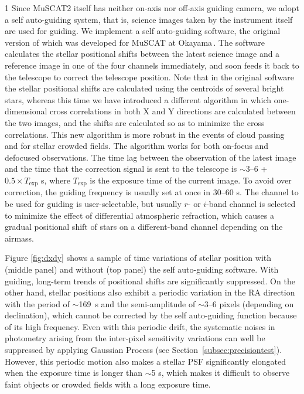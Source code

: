 \documentclass[a4paper,12pt]{spieman}  %
\begin{document}
\begin{spacing}{1}
Since MuSCAT2 itself has neither on-axis nor off-axis guiding camera,
we adopt a self auto-guiding system, that is, science images taken by the instrument itself
are used for guiding.
We implement a self auto-guiding software, the original version of which was developed
for MuSCAT at Okayama\cite{2015JATIS...1d5001N}\,\!.
The software calculates the stellar positional shifts between the latest science image and
a reference image in one of the four channels immediately,
and soon feeds it back to the telescope to correct the telescope position. 
Note that in the original software the stellar positional shifts are calculated
using the centroids of several bright stars, whereas this time we have introduced
a different algorithm in which one-dimensional cross correlations in both X and Y directions
are calculated between the two images,
and the shifts are calculated so as to minimize the cross correlations.
This new algorithm is more robust in the events of cloud passing and for stellar crowded fields.
The algorithm works for both on-focus and defocused observations.
The time lag between the observation of the latest image and the time that
the correction signal is sent to the telescope is $\sim$3--6 + $0.5\times T_\mathrm{exp}$ s,
where $T_\mathrm{exp}$ is the exposure time of the current image.
To avoid over correction, the guiding frequency is usually set at once in 30--60 s.
The channel to be used for guiding is user-selectable,
but usually $r$- or $i$-band channel is selected to minimize the effect of differential atmospheric refraction,
which causes a gradual positional shift of stars on a different-band channel depending on the airmass. 

Figure \ref{fig:dxdy} shows a sample of time variations of stellar position with (middle panel)
and without (top panel) the self auto-guiding software.
With guiding, long-term trends of positional shifts are significantly suppressed. 
On the other hand, stellar positions also exhibit a periodic variation in the RA direction
with the period of $\sim$169~s and the semi-amplitude of $\sim$3--6 pixels (depending on declination),
which cannot be corrected by the self auto-guiding function because of its high frequency.
Even with this periodic drift, the systematic noises in photometry arising from the inter-pixel sensitivity variations
can well be suppressed by applying Gaussian Process (see Section~\ref{subsec:precisiontest}).
However, this periodic motion also makes a stellar PSF significantly elongated when the exposure time
is longer than $\sim$5 s, which makes it difficult to observe faint objects or crowded fields with a long exposure time.


\end{spacing}
\end{document}
